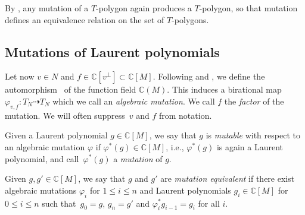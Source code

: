 \documentclass[11pt]{article}
\numberwithin{equation}{section}
\newcommand{\CC}{\mathbb{C}}
\begin{document}
	By \cite[Proposition 3.6]{AkhtarKasprzyk}, any mutation of a $T$-polygon again produces a $T$-polygon, so that mutation defines an equivalence relation on the set of $T$-polygons.
	\subsection{Mutations of Laurent polynomials}\label{sec:mutationsofLaurent}
	Let now $v \in N$ and $f \in \CC[v^\perp] \subset \CC[M]$. Following \cite{GrossHackingKeelClusterAlgebras} and \cite{AkhtarCoatesCorti}, we define the automorphism~
	of the function field $\CC(M)$. This
 induces a birational map
${\varphi_{v,f} \colon T_N \dashrightarrow T_N}$
	which we call an \emph{algebraic mutation}. We call $f$ the \emph{factor} of the mutation. We will often suppress~$v$ and $f$ from notation.
	\begin{Definition}\label{def:AlgebraicMutation}
		Given a Laurent polynomial $g \in \CC[M]$, we say that $g$ is {\it mutable} with respect to an algebraic mutation $\varphi$ if $\varphi^*(g)\in \CC[M]$, i.e., $\varphi^*(g)$ is again a Laurent polynomial, and call~$\varphi^*(g)$ a \emph{mutation} of $g$.

		Given $g, g' \in \CC[M]$, we say that $g$ and $g'$ are \emph{mutation equivalent} if there exist algebraic mutations $\varphi_i$ for $1 \leq i \leq n$ and Laurent polynomials $g_i \in \CC[M]$ for $0 \leq i \leq n$ such that~${g_0=g}$, ${g_n=g'}$ and $\varphi_i^*g_{i-1}=g_{i}$ for all $i$.
	\end{Definition}
\end{document}

